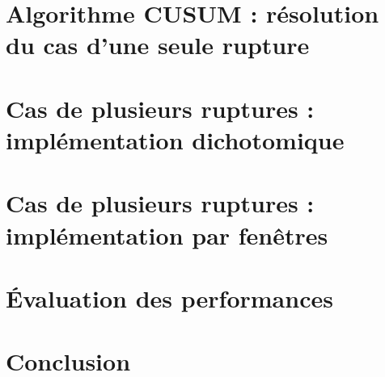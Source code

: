 \documentclass[french,12pt]{report}
\begin{document}
	\begin{figure}[h]
		\caption{}
		\label{}
	\end{figure}
	
	\chapter{Algorithme CUSUM : résolution du cas d'une seule rupture}
	
	\chapter{Cas de plusieurs ruptures : implémentation dichotomique}
	
	\chapter{Cas de plusieurs ruptures : implémentation par fenêtres}
	
	\chapter{Évaluation des performances}
	
	\chapter{Conclusion}
\end{document}
